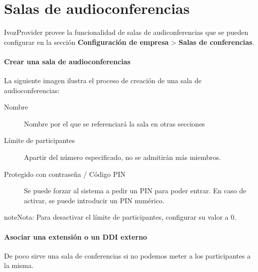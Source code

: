 \documentclass[letterpaper,10pt,spanish]{sphinxmanual}
\begin{document}
\section{Salas de audioconferencias}
\label{pbx_features/conference_rooms:salas-de-audioconferencias}\label{pbx_features/conference_rooms::doc}\label{pbx_features/conference_rooms:conference-rooms}
IvozProvider provee la funcionalidad de salas de audiconferencias que se pueden configurar en la sección \textbf{Configuración de empresa} \textgreater{} \textbf{Salas de conferencias}.
\paragraph{Crear una sala de audioconferencias}

La siguiente imagen ilustra el proceso de creación de una sala de audioconferencias:

\noindent{}
\begin{description}
\item[{Nombre}] \leavevmode{}\label{pbx_features/conference_rooms:term-nombre}
Nombre por el que se referenciará la sala en otras secciones

\item[{Límite de participantes}] \leavevmode{}\label{pbx_features/conference_rooms:term-limite-de-participantes}
Apartir del número especificado, no se admitirán más miembros.

\item[{Protegido con contraseña / Código PIN}] \leavevmode{}\label{pbx_features/conference_rooms:term-protegido-con-contrasena-codigo-pin}
Se puede forzar al sistema a pedir un PIN para poder entrar. En caso de activar, se puede introducir un PIN numérico.

\end{description}

\begin{notice}{note}{Nota:}
Para desactivar el límite de participantes, configurar su valor a 0.
\end{notice}
\paragraph{Asociar una extensión o un DDI externo}

De poco sirve una sala de conferencias si no podemos meter a los participantes a la misma.
\end{document}
